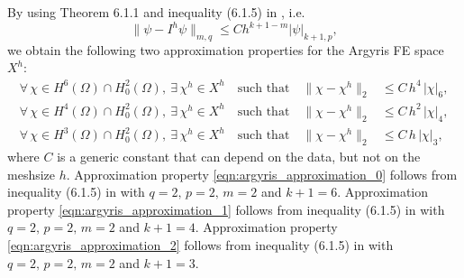 By using Theorem 6.1.1 and inequality (6.1.5) in \cite{Ciarlet}, i.e.
\begin{equation}
  \|\psi - I^h \psi\|_{m,q} \le C h^{k+1-m} |\psi|_{k+1,p},
  \label{eqn:ArgyrisBound}
\end{equation}
we obtain the following two approximation properties for the Argyris FE space
$X^h$:
\begin{align}
  \forall \, \chi \in H^6(\Omega) \cap H^2_0(\Omega), \ \exists \, \chi^h \in X^h
  \quad \text{such that} \quad
  \| \chi - \chi^h \|_2
  &\leq C \, h^4 \, | \chi |_6 ,
  \label{eqn:argyris_approximation_0} \\[0.2cm]
  \forall \, \chi \in H^4(\Omega) \cap H^2_0(\Omega), \ \exists \, \chi^h \in X^h
  \quad \text{such that} \quad
  \| \chi - \chi^h \|_2
  &\leq C \, h^2 \, | \chi |_4 ,
  \label{eqn:argyris_approximation_1} \\[0.2cm]
  \forall \, \chi \in H^3(\Omega) \cap H^2_0(\Omega), \ \exists \, \chi^h \in X^h
  \quad \text{such that} \quad
  \| \chi - \chi^h \|_2
  &\leq C \, h \, | \chi |_3 ,
  \label{eqn:argyris_approximation_2}
\end{align}
where $C$ is a generic constant that can depend on the data, but not on the
meshsize $h$.  Approximation property \eqref{eqn:argyris_approximation_0}
follows from inequality (6.1.5) in \cite{Ciarlet} with $q = 2, \, p = 2, \, m =
2$ and $k+1 = 6$. Approximation property \eqref{eqn:argyris_approximation_1}
follows from inequality (6.1.5) in \cite{Ciarlet} with $q = 2, \, p = 2, \, m =
2$ and $k+1 = 4$. Approximation property \eqref{eqn:argyris_approximation_2}
follows from inequality (6.1.5) in \cite{Ciarlet} with $q = 2, \, p = 2, \, m =
2$ and $k+1 = 3$.

